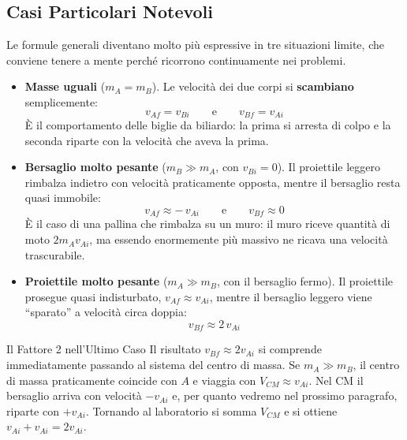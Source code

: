 \subsection{Casi Particolari Notevoli}

Le formule generali diventano molto più espressive in tre situazioni limite, che conviene tenere a mente perché ricorrono continuamente nei problemi.

\begin{itemize}
    \item \textbf{Masse uguali} ($m_A = m_B$). Le velocità dei due corpi si \textbf{scambiano} semplicemente:
    \begin{equation*}
        v_{Af} = v_{Bi} \qquad \text{e} \qquad v_{Bf} = v_{Ai}
    \end{equation*}
    È il comportamento delle biglie da biliardo: la prima si arresta di colpo e la seconda riparte con la velocità che aveva la prima.

    \item \textbf{Bersaglio molto pesante} ($m_B \gg m_A$, con $v_{Bi} = 0$). Il proiettile leggero rimbalza indietro con velocità praticamente opposta, mentre il bersaglio resta quasi immobile:
    \begin{equation*}
        v_{Af} \approx -\,v_{Ai} \qquad \text{e} \qquad v_{Bf} \approx 0
    \end{equation*}
    È il caso di una pallina che rimbalza su un muro: il muro riceve quantità di moto $2m_Av_{Ai}$, ma essendo enormemente più massivo ne ricava una velocità trascurabile.

    \item \textbf{Proiettile molto pesante} ($m_A \gg m_B$, con il bersaglio fermo). Il proiettile prosegue quasi indisturbato, $v_{Af} \approx v_{Ai}$, mentre il bersaglio leggero viene ``sparato'' a velocità circa doppia:
    \begin{equation*}
        v_{Bf} \approx 2\,v_{Ai}
    \end{equation*}
\end{itemize}

\begin{osservazione}{Il Fattore 2 nell'Ultimo Caso}
Il risultato $v_{Bf} \approx 2 v_{Ai}$ si comprende immediatamente passando al sistema del centro di massa. Se $m_A \gg m_B$, il centro di massa praticamente coincide con $A$ e viaggia con $V_{CM} \approx v_{Ai}$. Nel CM il bersaglio arriva con velocità $-v_{Ai}$ e, per quanto vedremo nel prossimo paragrafo, riparte con $+v_{Ai}$. Tornando al laboratorio si somma $V_{CM}$ e si ottiene $v_{Ai} + v_{Ai} = 2v_{Ai}$.
\end{osservazione}

